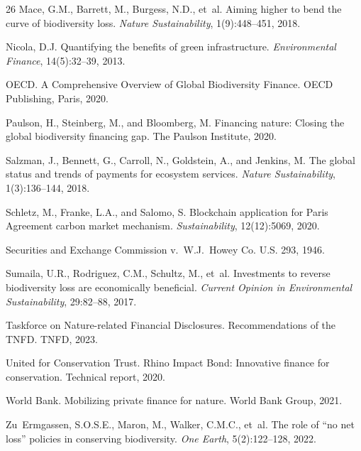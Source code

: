 \begin{thebibliography}{26}
Mace, G.M., Barrett, M., Burgess, N.D., et~al.
\newblock Aiming higher to bend the curve of biodiversity loss.
\newblock \emph{Nature Sustainability}, 1(9):448--451, 2018.

Nicola, D.J.
\newblock Quantifying the benefits of green infrastructure.
\newblock \emph{Environmental Finance}, 14(5):32--39, 2013.

OECD.
\newblock A Comprehensive Overview of Global Biodiversity Finance.
\newblock OECD Publishing, Paris, 2020.

Paulson, H., Steinberg, M., and Bloomberg, M.
\newblock Financing nature: Closing the global biodiversity financing gap.
\newblock The Paulson Institute, 2020.

Salzman, J., Bennett, G., Carroll, N., Goldstein, A., and Jenkins, M.
\newblock The global status and trends of payments for ecosystem services.
\newblock \emph{Nature Sustainability}, 1(3):136--144, 2018.

Schletz, M., Franke, L.A., and Salomo, S.
\newblock Blockchain application for Paris Agreement carbon market mechanism.
\newblock \emph{Sustainability}, 12(12):5069, 2020.

Securities and Exchange Commission v.\ W.J.\ Howey Co.
 U.S. 293, 1946.

Sumaila, U.R., Rodriguez, C.M., Schultz, M., et~al.
\newblock Investments to reverse biodiversity loss are economically beneficial.
\newblock \emph{Current Opinion in Environmental Sustainability}, 29:82--88, 2017.

Taskforce on Nature-related Financial Disclosures.
\newblock Recommendations of the TNFD.
\newblock TNFD, 2023.

United for Conservation Trust.
\newblock Rhino Impact Bond: Innovative finance for conservation.
\newblock Technical report, 2020.

World Bank.
\newblock Mobilizing private finance for nature.
\newblock World Bank Group, 2021.

Zu~Ermgassen, S.O.S.E., Maron, M., Walker, C.M.C., et~al.
\newblock The role of ``no net loss'' policies in conserving biodiversity.
\newblock \emph{One Earth}, 5(2):122--128, 2022.


\end{thebibliography}
